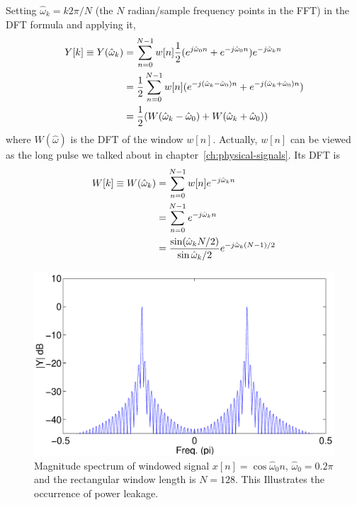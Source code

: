 Setting $\hat{\omega}_k = k2\pi/N$ (the $N$ radian/sample frequency
points in the FFT) in the DFT formula and applying it,
\begin{align}
Y[k] \equiv Y(\hat{\omega}_k) &= \sum_{n=0}^{N-1} w[n]
   \frac{1}{2}(e^{j\hat{\omega}_0 n}
               + e^{-j\hat{\omega}_0 n})e^{-j\hat{\omega}_kn} \notag\\
&= \frac{1}{2}\sum_{n=0}^{N-1} w[n]
   (e^{-j(\hat{\omega}_k-\hat{\omega}_0) n}
    + e^{-j (\hat{\omega}_k+\hat{\omega}_0) n}) \notag\\
&= \frac{1}{2} (W(\hat{\omega}_k-\hat{\omega}_0)
                 + W(\hat{\omega}_k+\hat{\omega}_0))
\label{eq:usefft-Y1}
\end{align}
where $W(\hat{\omega})$ is the DFT of the window $w[n]$. Actually,
$w[n]$ can be viewed as the long pulse we talked about in
chapter~\ref{ch:physical-signals}. Its DFT is
\begin{align}
W[k] \equiv W(\hat{\omega}_k) &= \sum_{n=0}^{N-1} w[n]
    e^{-j\hat{\omega}_k n} \notag\\
&= \sum_{n=0}^{N-1} e^{-j\hat{\omega}_k n}
\label{eq:usefft-rWk1}\\
&= \frac{\sin(\hat{\omega}_k N/2)}{\sin\hat{\omega}_k/2}e^{-j\hat{\omega}_k(N-1)/2}
\label{eq:usefft-rWk2}
\end{align}

\begin{figure}
\centerline{\includegraphics[width=6in]{ch-fft/ufft_cos0-2_rWX}}
\caption[Magnitude spectrum of windowed signal
{$x[n]=\cos\hat{\omega}_0 n$}]{Magnitude spectrum of windowed
signal $x[n]=\cos\hat{\omega}_0 n$, $\hat{\omega}_0=0.2\pi$ and the
rectangular window length is $N=128$. This Illustrates the occurrence
of power leakage.\label{fig:usefft-rWX1}}
\end{figure}

